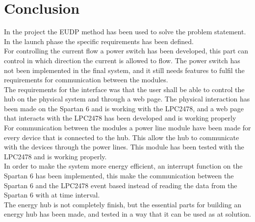 \chapter{Conclusion}
%
In the project the EUDP method has been used to solve the problem statement. In the launch phase the specific requirements has been defined.\\
For controlling the current flow a power switch has been developed, this part can control in which direction the current is allowed to flow. The power switch has not been implemented in the final system, and it still needs features to fulfil the requirements for communication between the modules.\\
The requirements for the interface was that the user shall be able to control the hub on the physical system and through a web page. The physical interaction has been made on the Spartan 6 and is working with the LPC2478, and a web page that interacts with the LPC2478 has been developed and is working properly\\
For communication between the modules a power line module have been made for every device that is connected to the hub. This allow the hub to communicate with the devices through the power lines. This module has been tested with the LPC2478 and is working properly.\\
In order to make the system more energy efficient, an interrupt function on the Spartan 6 has been implemented, this make the communication between the Spartan 6 and the LPC2478 event based instead of reading the data from the Spartan 6 with at time interval.\\
The energy hub is not completely finish, but the essential parts for building an energy hub has been made, and tested in a way that it can be used as at solution.

